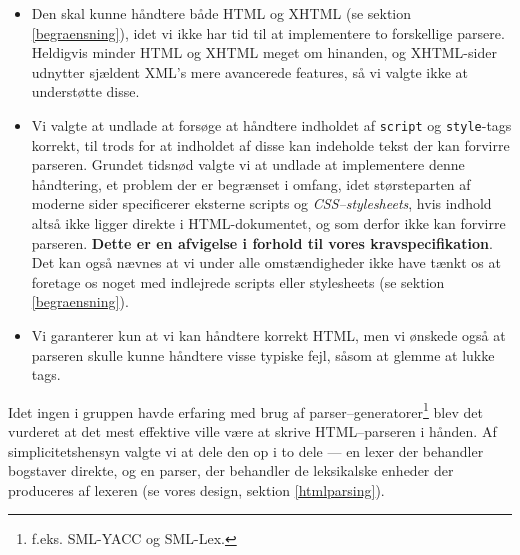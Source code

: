 \documentclass[a4paper,oneside]{memoir}
\begin{document}
\begin{itemize}
\item Den skal kunne håndtere både HTML og XHTML (se sektion
  \ref{begraensning}), idet vi ikke har tid til at implementere to
  forskellige parsere. Heldigvis minder HTML og XHTML meget om
  hinanden, og XHTML-sider udnytter sjældent XML's mere avancerede
  features, så vi valgte ikke at understøtte disse.
\item Vi valgte at undlade at forsøge at håndtere indholdet af
  \texttt{script} og \texttt{style}-tags korrekt, til trods for at
  indholdet af disse kan indeholde tekst der kan forvirre
  parseren. Grundet tidsnød valgte vi at undlade at implementere denne
  håndtering, et problem der er begrænset i omfang, idet størsteparten
  af moderne sider specificerer eksterne scripts og
  \textit{CSS--stylesheets}, hvis indhold altså ikke ligger direkte i
  HTML-dokumentet, og som derfor ikke kan forvirre
  parseren. \textbf{Dette er en afvigelse i forhold til vores
  kravspecifikation}. Det kan også nævnes at vi under alle
  omstændigheder ikke have tænkt os at foretage os noget med
  indlejrede scripts eller stylesheets (se sektion
  \ref{begraensning}).
\item Vi garanterer kun at vi kan håndtere korrekt HTML, men vi
  ønskede også at parseren skulle kunne håndtere visse typiske fejl,
  såsom at glemme at lukke tags.
\end{itemize}

Idet ingen i gruppen havde erfaring med brug af
parser--generatorer\footnote{f.eks. SML-YACC og SML-Lex.}
blev det vurderet at det mest effektive ville være at skrive
HTML--parseren i hånden. Af simplicitetshensyn valgte vi at dele den
op i to dele --- en lexer der behandler bogstaver direkte, og en
parser, der behandler de leksikalske enheder der produceres af lexeren
(se vores design, sektion \ref{htmlparsing}).
\end{document}

